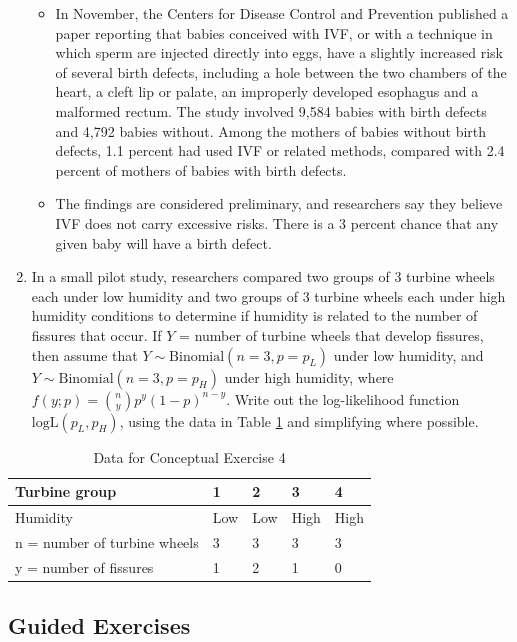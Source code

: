 \documentclass[
]{krantz}
\begin{document}
\begin{enumerate}
  \begin{itemize}
  \item
    In November, the Centers for Disease Control and Prevention published a paper reporting that babies conceived with IVF, or with a technique in which sperm are injected directly into eggs, have a slightly increased risk of several birth defects, including a hole between the two chambers of the heart, a cleft lip or palate, an improperly developed esophagus and a malformed rectum. The study involved 9,584 babies with birth defects and 4,792 babies without. Among the mothers of babies without birth defects, 1.1 percent had used IVF or related methods, compared with 2.4 percent of mothers of babies with birth defects.
  \item
    The findings are considered preliminary, and researchers say they believe IVF does not carry excessive risks. There is a 3 percent chance that any given baby will have a birth defect.
  \end{itemize}
\item
  In a small pilot study, researchers compared two groups of 3 turbine wheels each under low humidity and two groups of 3 turbine wheels each under high humidity conditions to determine if humidity is related to the number of fissures that occur. If \(Y\) = number of turbine wheels that develop fissures, then assume that \(Y \sim \textrm{Binomial}(n=3, p=p_L)\) under low humidity, and \(Y \sim \textrm{Binomial}(n=3, p=p_H)\) under high humidity, where \(f(y;p)=\binom{n}{y} p^y (1-p)^{n-y}\). Write out the log-likelihood function \(\textrm{logL}(p_L, p_H)\), using the data in Table \ref{tab:fissurechp6} and simplifying where possible.
\end{enumerate}

\begin{table}

\caption{\label{tab:fissurechp6}Data for Conceptual Exercise 4}
\centering
\begin{tabular}[t]{>{\raggedright\arraybackslash}p{2cm}llll}
\toprule
Turbine group & 1 & 2 & 3 & 4\\
\midrule
Humidity & Low & Low & High & High\\
n = number of turbine wheels & 3 & 3 & 3 & 3\\
y = number of fissures & 1 & 2 & 1 & 0\\
\bottomrule
\end{tabular}
\end{table}

\hypertarget{guided-exercises-1}{%
\subsection{Guided Exercises}\label{guided-exercises-1}}
\end{document}
